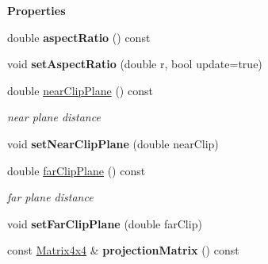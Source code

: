 \begin{Indent}\textbf{ Properties}\par
\begin{DoxyCompactItemize}
\item 
\mbox{\label{classrev_1_1_render_projection_a05244b221e3740b6d2b05580a9ab0b5d}} 
double {\bfseries aspect\+Ratio} () const
\item 
\mbox{\label{classrev_1_1_render_projection_a4ca9dbe313ff922e59e023342546cfa6}} 
void {\bfseries set\+Aspect\+Ratio} (double r, bool update=true)
\item 
\mbox{\label{classrev_1_1_render_projection_afbc3f99501213aff865753d46650827e}} 
double \mbox{\hyperlink{classrev_1_1_render_projection_afbc3f99501213aff865753d46650827e}{near\+Clip\+Plane}} () const
\begin{DoxyCompactList}\small\item\em near plane distance \end{DoxyCompactList}\item 
\mbox{\label{classrev_1_1_render_projection_aec2196f0f6ce65a7a23b7d01478fa4b9}} 
void {\bfseries set\+Near\+Clip\+Plane} (double near\+Clip)
\item 
\mbox{\label{classrev_1_1_render_projection_aa66eeba9942fec746879c892de6ebbd5}} 
double \mbox{\hyperlink{classrev_1_1_render_projection_aa66eeba9942fec746879c892de6ebbd5}{far\+Clip\+Plane}} () const
\begin{DoxyCompactList}\small\item\em far plane distance \end{DoxyCompactList}\item 
\mbox{\label{classrev_1_1_render_projection_ac3e77fcc909052f49e15cc624cc6a419}} 
void {\bfseries set\+Far\+Clip\+Plane} (double far\+Clip)
\item 
\mbox{\label{classrev_1_1_render_projection_aa88f951ae484e7aef5542f07a991d45c}} 
const \mbox{\hyperlink{classrev_1_1_square_matrix}{Matrix4x4}} \& {\bfseries projection\+Matrix} () const
\item 

\end{DoxyCompactItemize}
\end{Indent}
